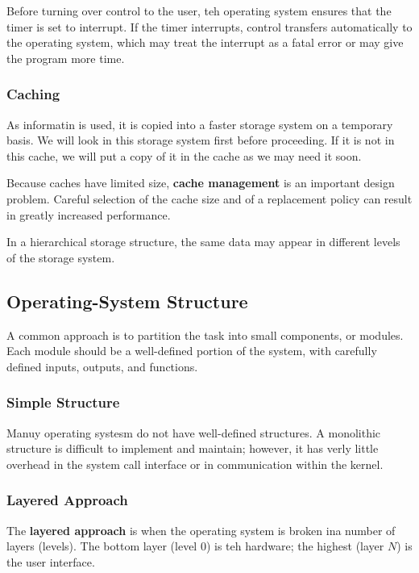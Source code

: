 \documentclass[]{article}
\begin{document}
Before turning over control to the user, teh operating system ensures that the
timer is set to interrupt. If the timer interrupts, control transfers
automatically to the operating system, which may treat the interrupt as a fatal
error or may give the program more time.

\subsubsection*{Caching}
As informatin is used, it is copied into a faster storage system on a temporary
basis. We will look in this storage system first before proceeding. If it is not
in this cache, we will put a copy of it in the cache as we may need it soon.

Because caches have limited size, \textbf{cache management} is an important
design problem. Careful selection of the cache size and of a replacement policy
can result in greatly increased performance.

In a hierarchical storage structure, the same data may appear in different
levels of the storage system.

\subsection*{Operating-System Structure}
A common approach is to partition the task into small components, or modules.
Each module should be a well-defined portion of the system, with carefully
defined inputs, outputs, and functions.

\subsubsection*{Simple Structure}
Manuy operating systesm do not have well-defined structures. A monolithic
structure is difficult to implement and maintain; however, it has verly little
overhead in the system call interface or in communication within the kernel.

\subsubsection*{Layered Approach}
The \textbf{layered approach} is when the operating system is broken ina number
of layers (levels). The bottom layer (level 0) is teh hardware; the highest
(layer $N$) is the user interface.
\end{document}

